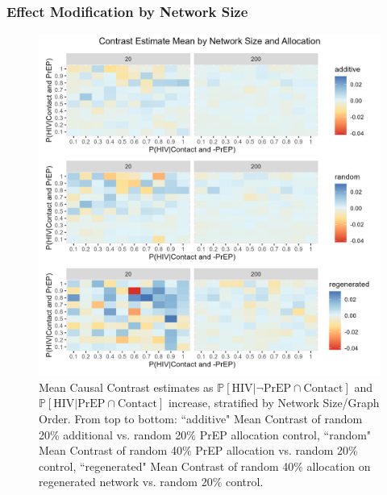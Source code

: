 \documentclass{article}
\theoremstyle{definition}
\begin{document}
\subsubsection{Effect Modification by Network Size}
\begin{figure}[H]
    \centering
    \includegraphics[width=\linewidth]{Figures/Network Size Mean Plot.png}
    \caption{Mean Causal Contrast estimates as $\mathbb{P}\left[\text{HIV} \vert \neg \text{PrEP} \cap \text{Contact}\right]$ and $\mathbb{P}\left[\text{HIV} \vert \text{PrEP} \cap \text{Contact}\right]$ increase, stratified by Network Size/Graph Order. From top to bottom: ``additive" Mean Contrast of random 20\% additional vs. random 20\% PrEP allocation control, ``random" Mean Contrast of random 40\% PrEP allocation vs. random 20\% control, ``regenerated" Mean Contrast of random 40\% allocation on regenerated network vs. random 20\% control. }
    \label{fig:Figure 7}
\end{figure}
\end{document}
